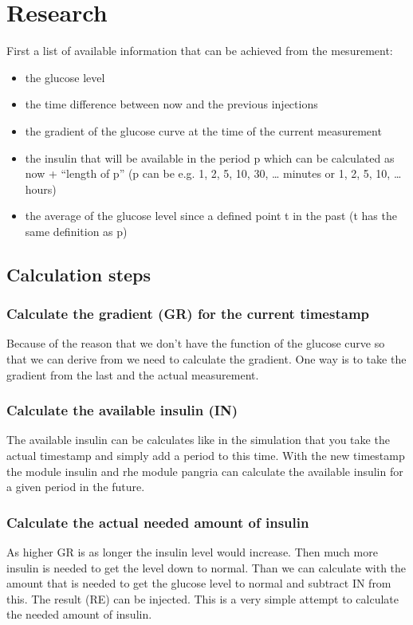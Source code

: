 \section{Research}
First a list of available information that can be achieved from the
mesurement:
\begin{itemize}
  \item the glucose level
  \item the time difference between now and the previous injections
  \item the gradient of the glucose curve at the time of the current measurement
  \item the insulin that will be available in the period p which can be
  calculated as now + “length of p” (p can be e.g. 1, 2, 5, 10, 30, … minutes
  or 1, 2, 5, 10, … hours)
  \item the average of the glucose level since a defined point t in the past (t
  has the same definition as p)
\end{itemize}

\subsection{Calculation steps}
\subsubsection{Calculate the gradient (GR) for the current timestamp}
Because of the reason that we don’t have the function of the glucose curve so
that we can derive from we need to calculate the gradient.
One way is to take the gradient from the last and the actual measurement.

\subsubsection{Calculate the available insulin (IN)}
The available insulin can be calculates like in the simulation that you take
the actual timestamp and simply add a period to this time. With the new
timestamp the module insulin and rhe module pangria can calculate the available
insulin for a given period in the future.

\subsubsection{Calculate the actual needed amount of insulin}
As higher GR is as longer the insulin level would increase. Then much more
insulin is needed to get the level down to normal. Than we can calculate with
the amount that is needed to get the glucose level to normal and subtract IN
from this. The result (RE) can be injected.
This is a very simple attempt to calculate the needed amount of insulin.

